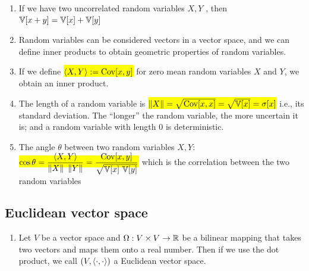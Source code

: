 \begin{enumerate}
    \item If we have two uncorrelated random variables $X, Y$ , then $ \mathbb{V}[x + y] = \mathbb{V}[x] + \mathbb{V}[y]  $
    \hfill \cite{mfml/book/mml/Deisenroth-Faisal-Ong}

    \item Random variables can be considered vectors in a vector space, and we can define inner products to obtain geometric properties of random variables.
    \hfill \cite{mfml/book/mml/Deisenroth-Faisal-Ong}

    \item If we define \colorbox{yellow}{$ \langle X, Y\rangle := \text{Cov}[x, y] $} for zero mean random variables $X$ and $Y $, we obtain an inner product.
    \hfill \cite{mfml/book/mml/Deisenroth-Faisal-Ong}

    \item The length of a random variable is \colorbox{yellow}{$ \left\| X \right\| = \sqrt{\text{Cov}[x, x]} =  \sqrt{\mathbb{V}[x]} = \sigma[x] $} i.e., its standard deviation. 
    The “longer” the random variable, the more uncertain it is; and a random variable with length $0$ is deterministic.
    \hfill \cite{mfml/book/mml/Deisenroth-Faisal-Ong}

    \item The angle $\theta$ between two random variables $X, Y$: 
    \colorbox{yellow}{$
        \cos \theta = \dfrac{\langle X, Y\rangle}{\left\| X \right\|\ \left\| Y \right\|} = \dfrac{\text{Cov}[x, y]}{\sqrt{\mathbb{V}[x]\ \mathbb{V}[y]}}
    $}
    which is the correlation between the two random variables
    \hfill \cite{mfml/book/mml/Deisenroth-Faisal-Ong}
\end{enumerate}








\subsection{Euclidean vector space}

\begin{enumerate}
    \item Let $V$ be a vector space and $\Omega : V \times V \to \mathbb{R}$ be a bilinear mapping that takes two vectors and maps them onto a real number. Then if we use the dot product, we call $(V,\langle\cdot, \cdot\rangle)$ a Euclidean vector space.
\end{enumerate}





